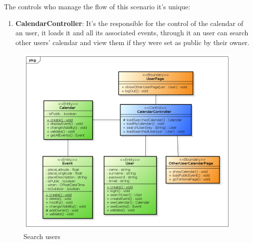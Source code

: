 The controls who manage the flow of this scenario it's unique:\begin{enumerate}
\item  {\bf CalendarController}: It's the responsible for the control of the calendar of an user, it loads it and all its associated events, through it an user can search other users' calendar and view them if they were set as public by their owner.

\end{enumerate}
\begin{center}
 \begin{figure}[H]
    \includegraphics[width=1\textwidth]{../BCEDiagram/BCE/EntityOverview/SearchUserBCE.png}
    \caption{Search users}
     \label{fig:searchBCE}
     \end{figure}
   \end{center} 
  
  
